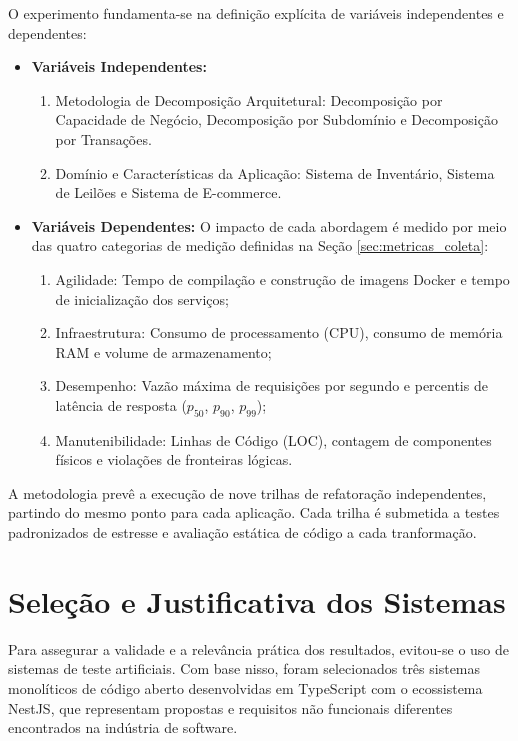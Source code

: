 O experimento fundamenta-se na definição explícita de variáveis independentes e dependentes:
\begin{itemize}
    \item \textbf{Variáveis Independentes:}
    \begin{enumerate}
        \item{Metodologia de Decomposição Arquitetural:} Decomposição por Capacidade de Negócio, Decomposição por Subdomínio e Decomposição por Transações.
        \item{Domínio e Características da Aplicação:} Sistema de Inventário, Sistema de Leilões e Sistema de E-commerce.
    \end{enumerate}
    \item \textbf{Variáveis Dependentes:} O impacto de cada abordagem é medido por meio das quatro categorias de medição definidas na Seção \ref{sec:metricas_coleta}:
    \begin{enumerate}
        \item{Agilidade:} Tempo de compilação e construção de imagens Docker e tempo de inicialização dos serviços;
        \item{Infraestrutura:} Consumo de processamento (CPU), consumo de memória RAM e volume de armazenamento;
        \item{Desempenho:} Vazão máxima de requisições por segundo e percentis de latência de resposta ($p_{50}$, $p_{90}$, $p_{99}$);
        \item{Manutenibilidade:} Linhas de Código (LOC), contagem de componentes físicos e violações de fronteiras lógicas.
    \end{enumerate}
\end{itemize}

A metodologia prevê a execução de nove trilhas de refatoração independentes, partindo do mesmo ponto para cada aplicação. Cada trilha é submetida a testes padronizados de estresse e avaliação estática de código a cada tranformação.

\section{Seleção e Justificativa dos Sistemas}
\label{sec:selecao_aplicacoes}

Para assegurar a validade e a relevância prática dos resultados, evitou-se o uso de sistemas de teste artificiais. Com base nisso, foram selecionados três sistemas monolíticos de código aberto desenvolvidas em TypeScript com o ecossistema NestJS, que representam propostas e requisitos não funcionais diferentes encontrados na indústria de software.

